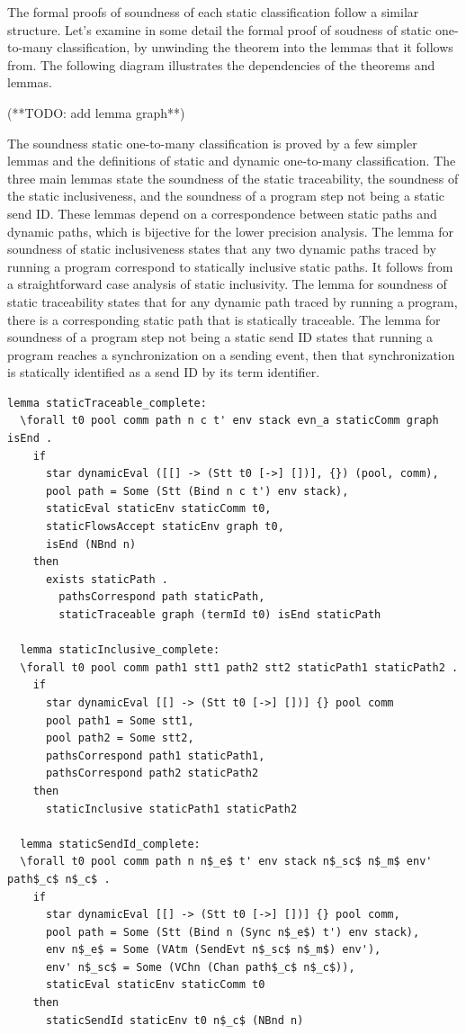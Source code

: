 \documentclass[10pt]{article}
\begin{document}
The formal proofs of soundness of each static classification follow a similar structure.
Let's examine in some detail the formal proof of soudness of static one-to-many classification,
by unwinding the theorem into the lemmas that it follows from.
The following diagram illustrates the dependencies of the theorems and lemmas.

(**TODO: add lemma graph**)


The soundness static one-to-many classification is proved by a few simpler lemmas and the
definitions of static and dynamic one-to-many classification.  The three main lemmas state the
soundness of the static traceability, the soundness of the static inclusiveness, and
the soundness of a program step not being a static send ID. These lemmas depend on a
correspondence between static paths and dynamic paths, which is bijective for the lower
precision analysis. The lemma for soundness of static inclusiveness states that any two
dynamic paths traced by running a program correspond to statically inclusive static paths. It
follows from a straightforward case analysis of static inclusivity. The lemma for soundness of
static traceability states that for any dynamic path traced by running a program, there
is a corresponding static path that is statically traceable. The lemma for soundness of a
program step not being a static send ID states that running a program reaches a
synchronization on a sending event, then that synchronization is statically identified as a
send ID by its term identifier.

\begin{lstlisting}[language=logic, mathescape]
  lemma staticTraceable_complete:
  \forall t0 pool comm path n c t' env stack evn_a staticComm graph isEnd .
    if
      star dynamicEval ([[] -> (Stt t0 [->] [])], {}) (pool, comm), 
      pool path = Some (Stt (Bind n c t') env stack),
      staticEval staticEnv staticComm t0,
      staticFlowsAccept staticEnv graph t0,
      isEnd (NBnd n)
    then
      exists staticPath . 
        pathsCorrespond path staticPath, 
        staticTraceable graph (termId t0) isEnd staticPath

  lemma staticInclusive_complete:
  \forall t0 pool comm path1 stt1 path2 stt2 staticPath1 staticPath2 . 
    if
      star dynamicEval [[] -> (Stt t0 [->] [])] {} pool comm
      pool path1 = Some stt1, 
      pool path2 = Some stt2, 
      pathsCorrespond path1 staticPath1, 
      pathsCorrespond path2 staticPath2
    then
      staticInclusive staticPath1 staticPath2

  lemma staticSendId_complete:
  \forall t0 pool comm path n n$_e$ t' env stack n$_sc$ n$_m$ env' path$_c$ n$_c$ .
    if
      star dynamicEval [[] -> (Stt t0 [->] [])] {} pool comm, 
      pool path = Some (Stt (Bind n (Sync n$_e$) t') env stack), 
      env n$_e$ = Some (VAtm (SendEvt n$_sc$ n$_m$) env'), 
      env' n$_sc$ = Some (VChn (Chan path$_c$ n$_c$)), 
      staticEval staticEnv staticComm t0
    then 
      staticSendId staticEnv t0 n$_c$ (NBnd n)
\end{lstlisting}
\end{document}

